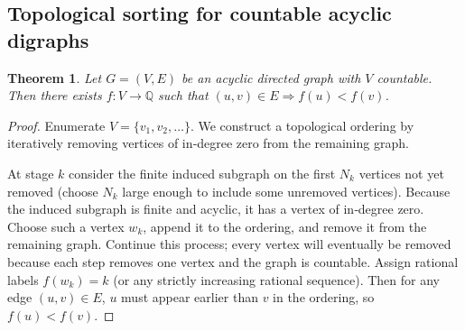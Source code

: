\documentclass[11pt]{article}
\newtheorem{theorem}[definition]{Theorem}
\begin{document}
\subsection*{Topological sorting for countable acyclic digraphs}
\begin{theorem}
Let $G=(V,E)$ be an acyclic directed graph with $V$ countable. Then there
exists $f:V\to\mathbb Q$ such that $(u,v)\in E\Rightarrow f(u)<f(v)$.
\end{theorem}

\begin{proof}
Enumerate $V=\{v_1,v_2,\dots\}$. We construct a topological ordering by
iteratively removing vertices of in‑degree zero from the remaining graph.

At stage $k$ consider the finite induced subgraph on the first $N_k$
vertices not yet removed (choose $N_k$ large enough to include some
unremoved vertices). Because the induced subgraph is finite and acyclic,
it has a vertex of in‑degree zero. Choose such a vertex $w_k$, append it
to the ordering, and remove it from the remaining graph. Continue this
process; every vertex will eventually be removed because each step
removes one vertex and the graph is countable. Assign rational labels
$f(w_k)=k$ (or any strictly increasing rational sequence). Then for any
edge $(u,v)\in E$, $u$ must appear earlier than $v$ in the ordering, so
$f(u)<f(v)$.
\end{proof}
\end{document}
